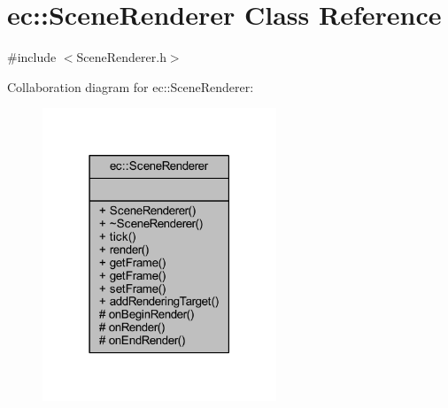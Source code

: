 \hypertarget{classec_1_1_scene_renderer}{}\section{ec\+:\+:Scene\+Renderer Class Reference}
\label{classec_1_1_scene_renderer}


{\ttfamily \#include $<$Scene\+Renderer.\+h$>$}



Collaboration diagram for ec\+:\+:Scene\+Renderer\+:\nopagebreak
\begin{figure}[H]
\begin{center}
\leavevmode
\includegraphics[width=198pt]{classec_1_1_scene_renderer__coll__graph}
\end{center}
\end{figure}
